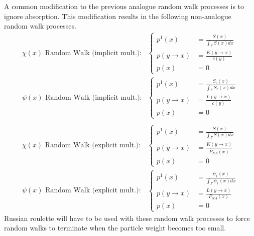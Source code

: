 A common modification to the previous analogue random walk processes is to 
ignore absorption. This modification results in the following non-analogue
random walk processes. 
\begin{align}
  \chi(x)\text{ Random Walk (implicit mult.):}&
  \begin{cases}
    p^1(x) & = \frac{S(x)}{\int_{\Gamma} S(x)dx} \\
    p(y \to x) &  = \frac{K(y \to x)}{\bar{c}(y)} \\
    p(x) & = 0
  \end{cases} \\
  \psi(x)\text{ Random Walk (implicit mult.):}&
  \begin{cases}
    p^1(x) & = \frac{S_c(x)}{\int_{\Gamma} S_c(x)dx} \\
    p(y \to x) & = \frac{L(y \to x) }{c(y)} \\
    p(x) & = 0
  \end{cases} \\
  \nonumber \\
  \chi(x)\text{ Random Walk (explicit mult.):}&
  \begin{cases}
    p^1(x) & = \frac{S(x)}{\int_{\Gamma} S(x)dx} \\
    p(y \to x) &  = \frac{K(y \to x)}{\overline{P}_{NA}(x)} \\
    p(x) & = 0
  \end{cases}
  \label{eq:mc_random_walk_emission_dens_nonan} \\
  \psi(x)\text{ Random Walk (explicit mult.):} &
  \begin{cases}
    p^1(x) & = \frac{\psi_1(x)}{\int_{\Gamma}\psi_1(x)dx} \\
    p(y \to x) & = \frac{L(y \to x)}{P_{NA}(x)} \\
    p(x) & = 0
  \end{cases}
  \label{eq:mc_random_walk_collision_dens_nonan}
\end{align}
Russian roulette will have to be used with these random walk processes to 
force random walks to terminate when the particle weight becomes too small. 

